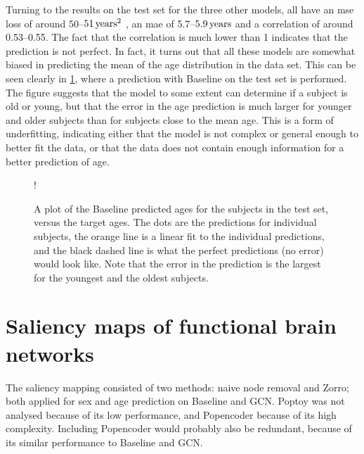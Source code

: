 Turning to the results on the test set for the three other models, all have an \acrshort{mse} loss of around 50--$51\rm\,years^2$ , an \acrshort{mae} of 5.7--$5.9\rm\,years$ and a correlation of around 0.53--0.55. The fact that the correlation is much lower than 1 indicates that the prediction is not perfect. In fact, it turns out that all these models are somewhat biased in predicting the mean of the age distribution in the data set. This can be seen clearly in \cref{fig:age_regression}, where a prediction with Baseline on the test set is performed. The figure suggests that the model to some extent can determine if a subject is old or young, but that the error in the age prediction is much larger for younger and older subjects than for subjects close to the mean age. This is a form of underfitting, indicating either that the model is not complex or general enough to better fit the data, or that the data does not contain enough information for a better prediction of age.

\begin{figure}[!htbp]
    \centering
    \begin{center}
        \resizebox {0.6\linewidth} {!} {
            
        }
    \end{center}
    \caption{A plot of the Baseline predicted ages for the subjects in the test set, versus the target ages. The dots are the predictions for individual subjects, the orange line is a linear fit to the individual predictions, and the black dashed line is what the perfect predictions (no error) would look like. Note that the error in the prediction is the largest for the youngest and the oldest subjects.}
    \label{fig:age_regression}
\end{figure}

\section{Saliency maps of functional brain networks}
The saliency mapping consisted of two methods: naive node removal and Zorro; both applied for sex and age prediction on Baseline and GCN. Poptoy was not analysed because of its low performance, and Popencoder because of its high complexity. Including Popencoder would probably also be redundant, because of its similar performance to Baseline and GCN. 

